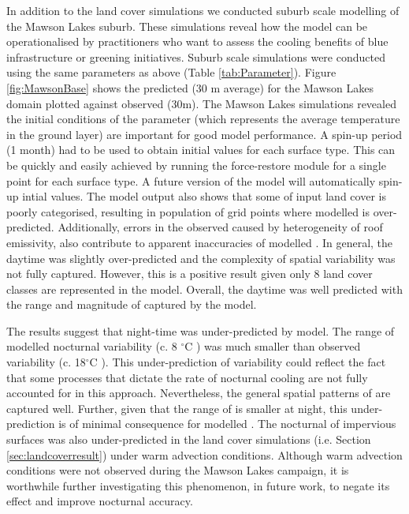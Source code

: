 \documentclass[final,3p,times,authoryear]{elsarticle}
\newcommand{\degreeC}{\ensuremath{^\circ}C }
\begin{document}
In addition to the land cover simulations we conducted suburb scale modelling of the Mawson Lakes suburb. These simulations reveal how the  model can be operationalised by practitioners who want to assess the cooling benefits of blue infrastructure or greening initiatives. Suburb scale simulations were conducted using the same parameters as above (Table \ref{tab:Parameter}). Figure \ref{fig:MawsonBase} shows the predicted  (30 m average) for the Mawson Lakes domain plotted against observed  (30m). The Mawson Lakes simulations revealed the initial conditions of the  parameter (which represents the average temperature in the ground layer) are  important for good model performance. A spin-up period (1 month) had to be used to obtain initial  values for each surface type. This can be quickly and easily achieved by running the force-restore module for a single point for each surface type. A future version of the model will automatically spin-up intial  values. The model output also shows that some of input land cover is poorly categorised, resulting in population of grid points where modelled  is  over-predicted. Additionally, errors in the observed  caused by heterogeneity of roof emissivity,  also contribute to apparent inaccuracies of modelled . In general, the daytime  was slightly over-predicted and the complexity of spatial variability was not fully captured. However, this is a positive result given only 8 land cover classes are represented in the model. Overall, the daytime  was well predicted with the range and magnitude of  captured by the model. 

The results suggest that night-time  was under-predicted by model. The range of modelled nocturnal  variability (c. 8 \degreeC) was much smaller than observed variability (c. 18\degreeC). This under-prediction of variability could reflect the fact that some processes that dictate the rate of nocturnal cooling are not fully accounted for in this approach. Nevertheless, the general spatial patterns of  are captured well. Further, given that the  range of  is smaller at night, this under-prediction is of minimal consequence for modelled . The nocturnal  of impervious surfaces was also under-predicted in the land cover simulations (i.e. Section \ref{sec:landcoverresult}) under warm advection conditions. Although warm advection conditions were not observed during the Mawson Lakes campaign, it is worthwhile further investigating this phenomenon, in future work, to negate its effect and improve nocturnal  accuracy. 
\end{document}
